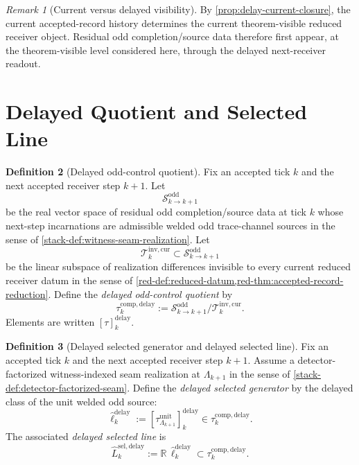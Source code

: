 \documentclass[11pt]{article}
\theoremstyle{definition}
\newtheorem{definition}{Definition}[section]
\theoremstyle{plain}
\theoremstyle{remark}
\newtheorem{remark}[definition]{Remark}
\begin{document}
\begin{remark}[Current versus delayed visibility]
\label{rem:delay-zigzag}
By \cref{prop:delay-current-closure}, the current accepted-record history determines the current
theorem-visible reduced receiver object. Residual odd completion/source data therefore first appear,
at the theorem-visible level considered here, through the delayed next-receiver readout.
\end{remark}

\section{Delayed Quotient and Selected Line}

\begin{definition}[Delayed odd-control quotient]
\label{def:delayed-odd-class}
Fix an accepted tick \(k\) and the next accepted receiver step \(k+1\).
Let
\[
\mathcal S^{\mathrm{odd}}_{k\to k+1}
\]
be the real vector space of residual odd completion/source data at tick \(k\) whose next-step
incarnations are admissible welded odd trace-channel sources in the sense of
\cref{stack-def:witness-seam-realization}.
Let
\[
\mathcal T^{\mathrm{inv,cur}}_k
\subset
\mathcal S^{\mathrm{odd}}_{k\to k+1}
\]
be the linear subspace of realization differences invisible to every current reduced receiver datum
in the sense of \cref*{red-def:reduced-datum,red-thm:accepted-record-reduction}.
Define the \emph{delayed odd-control quotient} by
\[
\tau^{\mathrm{comp,delay}}_k
:=
\mathcal S^{\mathrm{odd}}_{k\to k+1}\big/\mathcal T^{\mathrm{inv,cur}}_k.
\]
Elements are written
\(
[\tau]^{\mathrm{delay}}_k
\).
\end{definition}

\begin{definition}[Delayed selected generator and delayed selected line]
\label{def:delayed-selected-line}
Fix an accepted tick \(k\) and the next accepted receiver step \(k+1\).
Assume a detector-factorized witness-indexed seam realization at \(\Lambda_{k+1}\) in the sense of
\cref{stack-def:detector-factorized-seam}.
Define the \emph{delayed selected generator} by the delayed class of the unit welded odd source:
\[
\widehat\ell^{\mathrm{delay}}_k
:=
[\tau^{\mathrm{unit}}_{\Lambda_{k+1}}]^{\mathrm{delay}}_k
\in
\tau^{\mathrm{comp,delay}}_k.
\]
The associated \emph{delayed selected line} is
\[
\widehat L^{\mathrm{sel,delay}}_k
:=
\mathbb R\,\widehat\ell^{\mathrm{delay}}_k
\subset
\tau^{\mathrm{comp,delay}}_k.
\]
\end{definition}
\end{document}
